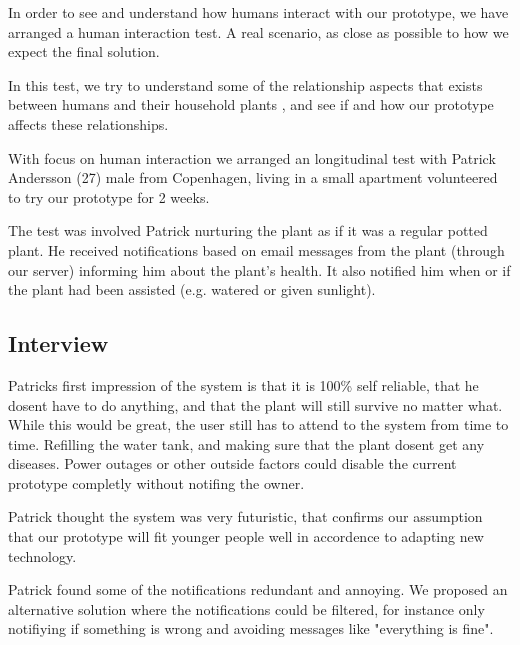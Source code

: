 \documentclass{ubicomp2012}
\begin{document}
In order to see and understand how humans interact with our prototype, we have arranged a human interaction test. A real scenario, as close as possible to how we expect the final solution.

In this test, we try to understand some of the relationship aspects that exists between humans and their household plants \cite{People-Plant-Relationship}, and see if and how our prototype affects these relationships.

With focus on human interaction we arranged an longitudinal test with Patrick Andersson (27) male from Copenhagen, living in a small apartment volunteered to try our prototype for 2 weeks.

The test was involved Patrick nurturing the plant as if it was a regular potted plant. He received notifications based on email messages from the plant (through our server) informing him about the plant’s health. It also notified him when or if the plant had been assisted (e.g. watered or given sunlight).

\subsection{Interview}
Patricks first impression of the system is that it is 100\% self reliable, that he dosent have to do anything, and that the plant will still survive no matter what. While this would be great, the user still has to attend to the system from time to time. Refilling the water tank, and making sure that the plant dosent get any diseases. Power outages or other outside factors could disable the current prototype completly without notifing the owner.

Patrick thought the system was very futuristic, that confirms our assumption that our prototype will fit younger people well in accordence to adapting new technology.

Patrick found some of the notifications redundant and annoying. We proposed an alternative solution where the notifications could be filtered, for instance only notifiying if something is wrong and avoiding messages like "everything is fine".
\end{document}
